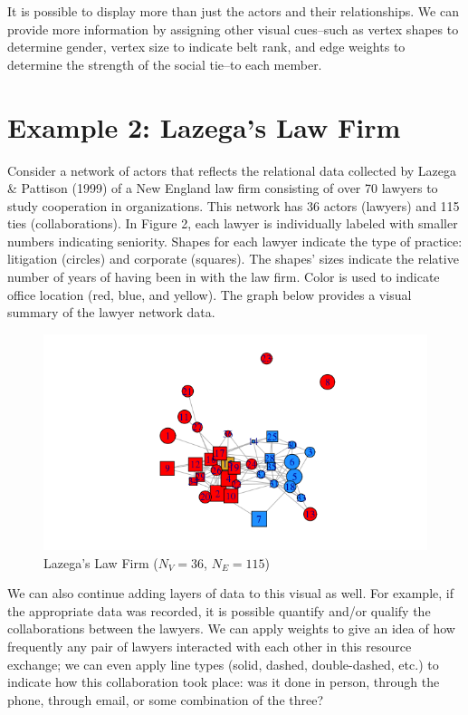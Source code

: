 \documentclass[12pt,twoside]{amherstthesis}
\begin{document}
  It is possible to display more than just the actors and their
  relationships. We can provide more information by assigning other visual
  cues--such as vertex shapes to determine gender, vertex size to indicate
  belt rank, and edge weights to determine the strength of the social
  tie--to each member.
  
  \section{Example 2: Lazega's Law Firm}\label{example-2-lazegas-law-firm}
  
  Consider a network of actors that reflects the relational data collected
  by Lazega \& Pattison (1999) of a New England law firm consisting of
  over 70 lawyers to study cooperation in organizations. This network has
  36 actors (lawyers) and 115 ties (collaborations). In Figure 2, each
  lawyer is individually labeled with smaller numbers indicating
  seniority. Shapes for each lawyer indicate the type of practice:
  litigation (circles) and corporate (squares). The shapes' sizes indicate
  the relative number of years of having been in with the law firm. Color
  is used to indicate office location (red, blue, and yellow). The graph
  below provides a visual summary of the lawyer network data.
  
  \begin{figure}[htbp]
  \centering
  \includegraphics{figure/02lawyerplot.png}
  \caption{Lazega's Law Firm (\(N_V = 36\), \(N_E = 115\))}
  \end{figure}
  
  We can also continue adding layers of data to this visual as well. For
  example, if the appropriate data was recorded, it is possible quantify
  and/or qualify the collaborations between the lawyers. We can apply
  weights to give an idea of how frequently any pair of lawyers interacted
  with each other in this resource exchange; we can even apply line types
  (solid, dashed, double-dashed, etc.) to indicate how this collaboration
  took place: was it done in person, through the phone, through email, or
  some combination of the three?
  
\end{document}
